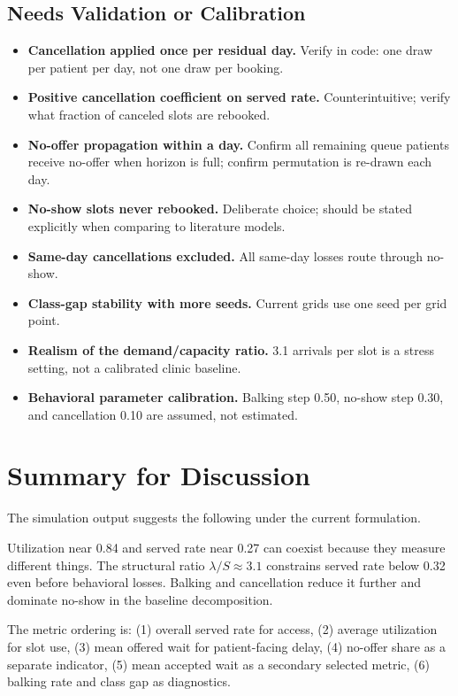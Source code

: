 \documentclass[11pt]{article}
\begin{document}
\subsection{Needs Validation or Calibration}

\begin{itemize}[leftmargin=1.5em, itemsep=4pt]
  \item \textbf{Cancellation applied once per residual day.}
    Verify in code: one draw per patient per day, not one draw per
    booking.
  \item \textbf{Positive cancellation coefficient on served rate.}
    Counterintuitive; verify what fraction of canceled slots are
    rebooked.
  \item \textbf{No-offer propagation within a day.}
    Confirm all remaining queue patients receive no-offer when horizon
    is full; confirm permutation is re-drawn each day.
  \item \textbf{No-show slots never rebooked.}  Deliberate choice;
    should be stated explicitly when comparing to literature models.
  \item \textbf{Same-day cancellations excluded.}  All same-day losses
    route through no-show.
  \item \textbf{Class-gap stability with more seeds.}  Current grids
    use one seed per grid point.
  \item \textbf{Realism of the demand/capacity ratio.}  3.1 arrivals
    per slot is a stress setting, not a calibrated clinic baseline.
  \item \textbf{Behavioral parameter calibration.}  Balking step 0.50,
    no-show step 0.30, and cancellation 0.10 are assumed, not
    estimated.
\end{itemize}

\section{Summary for Discussion}

The simulation output suggests the following under the current
formulation.

Utilization near 0.84 and served rate near 0.27 can coexist because
they measure different things.  The structural ratio
$\lambda/S \approx 3.1$ constrains served rate below 0.32 even before
behavioral losses.  Balking and cancellation reduce it further and
dominate no-show in the baseline decomposition.

The metric ordering is: (1) overall served rate for access, (2) average
utilization for slot use, (3) mean offered wait for patient-facing
delay, (4) no-offer share as a separate indicator, (5) mean accepted
wait as a secondary selected metric, (6) balking rate and class gap as
diagnostics.
\end{document}

